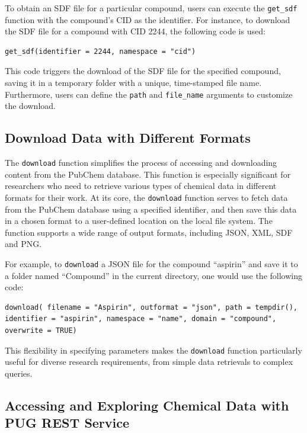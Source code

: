 To obtain an SDF file for a particular compound, users can execute the \texttt{get\_sdf} function with the compound's CID as the identifier. For instance, to download the SDF file for a compound with CID 2244, the following code is used:

\begin{verbatim}
get_sdf(identifier = 2244, namespace = "cid") 
\end{verbatim}

This code triggers the download of the SDF file for the specified compound, saving it in a temporary folder with a unique, time-stamped file name. Furthermore, users can define the \texttt{path} and \texttt{file\_name} arguments to customize the download.

\hypertarget{download-data-with-different-formats}{%
\subsection{Download Data with Different Formats}\label{download-data-with-different-formats}}

The \texttt{download} function simplifies the process of accessing and downloading content from the PubChem database. This function is especially significant for researchers who need to retrieve various types of chemical data in different formats for their work. At its core, the \texttt{download} function serves to fetch data from the PubChem database using a specified identifier, and then save this data in a chosen format to a user-defined location on the local file system. The function supports a wide range of output formats, including JSON, XML, SDF and PNG.

For example, to \texttt{download} a JSON file for the compound ``aspirin'' and save it to a folder named ``Compound'' in the current directory, one would use the following code:

\begin{verbatim}
download( filename = "Aspirin", outformat = "json", path = tempdir(), 
identifier = "aspirin", namespace = "name", domain = "compound", overwrite = TRUE)
\end{verbatim}

This flexibility in specifying parameters makes the \texttt{download} function particularly useful for diverse research requirements, from simple data retrievals to complex queries.

\hypertarget{accessing-and-exploring-chemical-data-with-pug-rest-service}{%
\subsection{Accessing and Exploring Chemical Data with PUG REST Service}\label{accessing-and-exploring-chemical-data-with-pug-rest-service}}

